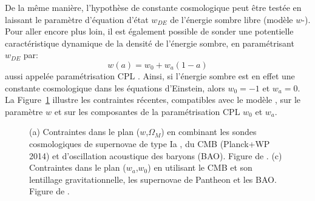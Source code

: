 \documentclass[../main/main.tex]{subfiles}
\begin{document}
De la même manière, l'hypothèse de constante cosmologique peut être
testée en laissant le paramètre d'équation d'état $w_{DE}$ de l'énergie
sombre libre (modèle $w$-\lcdm). Pour aller encore plus loin, il est
également possible de sonder une potentielle caractéristique dynamique
de la densité de l'énergie sombre, en paramétrisant $w_{DE}$ par:
\begin{equation}
  \label{eq:wCPL}
  w(a)=w_{0}+w_{a}(1-a)
\end{equation}
aussi appelée paramétrisation CPL \citep{CPL2001,Linder2003}. Ainsi, si
l'énergie sombre est en effet une constante cosmologique dans les
équations d'Einstein, alors $w_{0}=-1$ et $w_{a}=0$. La
Figure~\ref{fig:darkenergy} illustre les contraintes récentes,
compatibles avec le modèle \lcdm, sur le
paramètre $w$ et sur les composantes de la paramétrisation CPL $w_{0}$ et $w_{a}$.

\begin{figure}[ht]
\centering
{}\hfill
{}
\caption[]{(a) Contraintes dans le plan
  ($w$,$\Omega_{M}$) en combinant les sondes
  cosmologiques de supernovae de type Ia \citep[JLA,][]{Betoule2014}, du CMB (Planck+WP 2014) et d'oscillation
  acoustique des baryons (BAO). Figure de \citet{Betoule2014}. (c)
  Contraintes dans le plan ($w_{a}$,$w_{0}$) en utilisant le
  CMB et son lentillage gravitationnelle, les supernovae de Pantheon
  \citep{Scolnicpantheon18} et les BAO. Figure de \citet{Planckparams2018}.}
\label{fig:darkenergy}
\end{figure}
\end{document}
